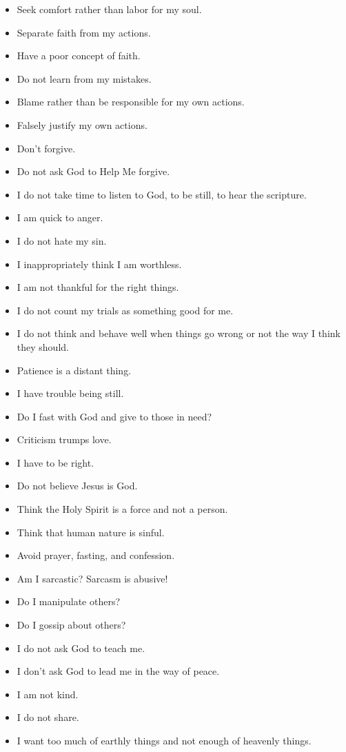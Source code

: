 \begin{itemize}
\item Seek comfort rather than labor for my soul.
\item Separate faith from my actions.
\item Have a poor concept of faith.
\item Do not learn from my mistakes.
\item Blame rather than be responsible for my own actions.
\item Falsely justify my own actions.
\item Don't forgive.
\item Do not ask God to Help Me forgive.
\item I do not take time to listen to God, to be still, to hear the scripture.
\item I am quick to anger.
\item I do not hate my sin.
\item I inappropriately think I am worthless.
\item I am not thankful for the right things.
\item I do not count my trials as something good for me.
\item I do not think and behave well when things go wrong or not the way I think they should.
\item Patience is a distant thing.
\item I have trouble being still.
\item Do I fast with God and give to those in need?
\item Criticism trumps love.
\item I have to be right.
\item Do not believe Jesus is God.
\item Think the Holy Spirit is a force and not a person.
\item Think that human nature is sinful.
\item Avoid prayer, fasting, and confession.
\item Am I sarcastic? Sarcasm is abusive!
\item Do I manipulate others?
\item Do I gossip about others?
\item I do not ask God to teach me.
\item I don't ask God to lead me in the way of peace.
\item I am not kind.
\item I do not share.
\item I want too much of earthly things and not enough of heavenly things.

\end{itemize}
